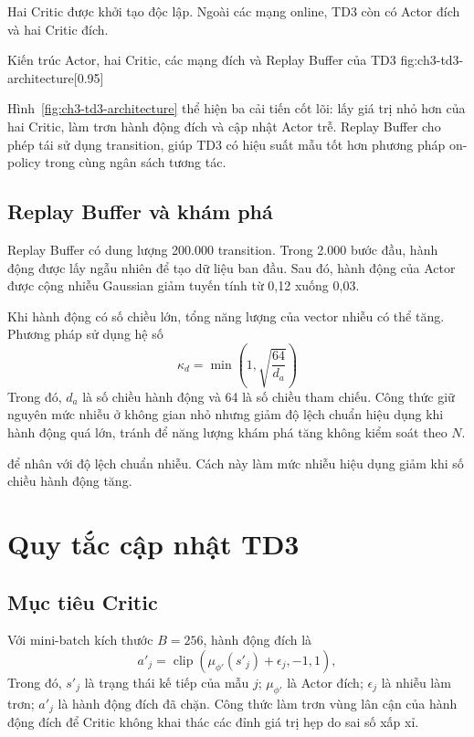 Hai Critic được khởi tạo độc lập. Ngoài các mạng online, TD3 còn có Actor đích và hai Critic đích.

{Kiến trúc Actor, hai Critic, các mạng đích và Replay Buffer của TD3}
{fig:ch3-td3-architecture}[0.95\linewidth]

Hình~\ref{fig:ch3-td3-architecture} thể hiện ba cải tiến cốt lõi: lấy giá trị nhỏ hơn của hai Critic, làm trơn hành động đích và cập nhật Actor trễ. Replay Buffer cho phép tái sử dụng transition, giúp TD3 có hiệu suất mẫu tốt hơn phương pháp on-policy trong cùng ngân sách tương tác.

\subsection{Replay Buffer và khám phá}
Replay Buffer có dung lượng 200.000 transition. Trong 2.000 bước đầu, hành động được lấy ngẫu nhiên để tạo dữ liệu ban đầu. Sau đó, hành động của Actor được cộng nhiễu Gaussian giảm tuyến tính từ 0,12 xuống 0,03.

Khi hành động có số chiều lớn, tổng năng lượng của vector nhiễu có thể tăng. Phương pháp sử dụng hệ số
\begin{equation}
 \kappa_d=\min\left(1,\sqrt{\frac{64}{d_a}}\right)
 \label{eq:noise-scaling-ch3}
\end{equation}
Trong đó, $d_a$ là số chiều hành động và 64 là số chiều tham chiếu. Công thức giữ nguyên mức nhiễu ở không gian nhỏ nhưng giảm độ lệch chuẩn hiệu dụng khi hành động quá lớn, tránh để năng lượng khám phá tăng không kiểm soát theo $N$.

để nhân với độ lệch chuẩn nhiễu. Cách này làm mức nhiễu hiệu dụng giảm khi số chiều hành động tăng.

\section{Quy tắc cập nhật TD3}
\subsection{Mục tiêu Critic}
Với mini-batch kích thước $B=256$, hành động đích là
\begin{equation}
 a'_j=\operatorname{clip}\left(\mu_{\phi'}(s'_j)+\epsilon_j,-1,1\right),
\end{equation}
Trong đó, $s'_j$ là trạng thái kế tiếp của mẫu $j$; $\mu_{\phi'}$ là Actor đích; $\epsilon_j$ là nhiễu làm trơn; $a'_j$ là hành động đích đã chặn. Công thức làm trơn vùng lân cận của hành động đích để Critic không khai thác các đỉnh giá trị hẹp do sai số xấp xỉ.

